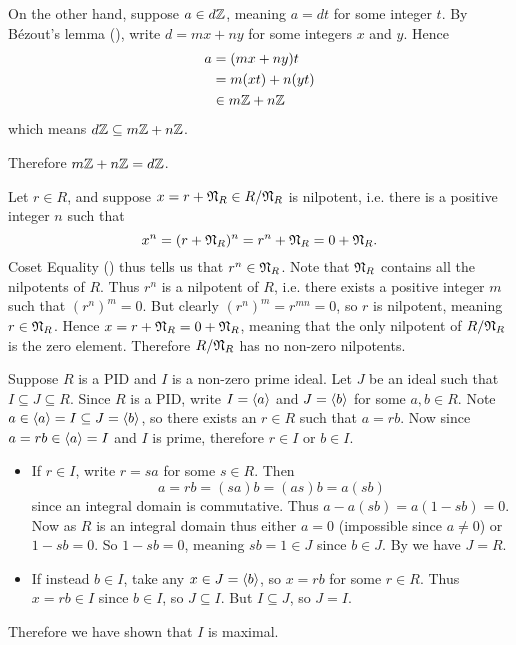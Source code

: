 \begin{questions}
\begin{partquestions}{\alph*}
        On the other hand, suppose $a \in d\mathbb{Z}$, meaning $a = dt$ for some integer $t$. By B\'{e}zout's lemma (), write $d = mx + ny$ for some integers $x$ and $y$. Hence
        \begin{align*}
            a &= (mx + ny)t\\
            &= m(xt) + n(yt)\\
            &\in m\mathbb{Z} + n\mathbb{Z}
        \end{align*}
        which means $d\mathbb{Z} \subseteq m\mathbb{Z} + n\mathbb{Z}$.

        Therefore $m\mathbb{Z} + n\mathbb{Z} = d\mathbb{Z}$.
    \end{partquestions}

    \item Let $r \in R$, and suppose $x = r + \mathfrak{N}_{R} \in R/\mathfrak{N}_{R}$ is nilpotent, i.e. there is a positive integer $n$ such that
    \[
        x^n = (r + \mathfrak{N}_{R})^n = r^n + \mathfrak{N}_{R} = 0 + \mathfrak{N}_{R}.
    \]
    Coset Equality () thus tells us that $r^n \in \mathfrak{N}_{R}$. Note that $\mathfrak{N}_{R}$ contains all the nilpotents of $R$. Thus $r^n$ is a nilpotent of $R$, i.e. there exists a positive integer $m$ such that $(r^n)^m = 0$. But clearly $(r^n)^m = r^{mn} = 0$, so $r$ is nilpotent, meaning $r \in \mathfrak{N}_{R}$. Hence $x = r + \mathfrak{N}_{R} = 0 + \mathfrak{N}_{R}$, meaning that the only nilpotent of $R/\mathfrak{N}_{R}$ is the zero element. Therefore $R/\mathfrak{N}_{R}$ has no non-zero nilpotents.

    \item Suppose $R$ is a PID and $I$ is a non-zero prime ideal. Let $J$ be an ideal such that $I \subseteq J \subseteq R$. Since $R$ is a PID, write $I = \left\langle a\right\rangle$ and $J = \left\langle b\right\rangle$ for some $a, b \in R$. Note $a \in \left\langle a\right\rangle = I \subseteq J = \left\langle b\right\rangle$, so there exists an $r \in R$ such that $a = rb$. Now since $a = rb \in \left\langle a\right\rangle = I$ and $I$ is prime, therefore $r \in I$ or $b \in I$.
    \begin{itemize}
        \item If $r \in I$, write $r = sa$ for some $s \in R$. Then
        \[
            a = rb = (sa)b = (as)b = a(sb)
        \]
        since an integral domain is commutative. Thus $a - a(sb) = a(1-sb) = 0$. Now as $R$ is an integral domain thus either $a = 0$ (impossible since $a \neq 0$) or $1-sb = 0$. So $1-sb = 0$, meaning $sb = 1 \in J$ since $b \in J$. By  we have $J = R$.
        \item If instead $b \in I$, take any $x \in J = \left\langle b\right\rangle$, so $x = rb$ for some $r \in R$. Thus $x = rb \in I$ since $b \in I$, so $J \subseteq I$. But $I \subseteq J$, so $J = I$.
    \end{itemize}
    Therefore we have shown that $I$ is maximal.


\end{questions}
